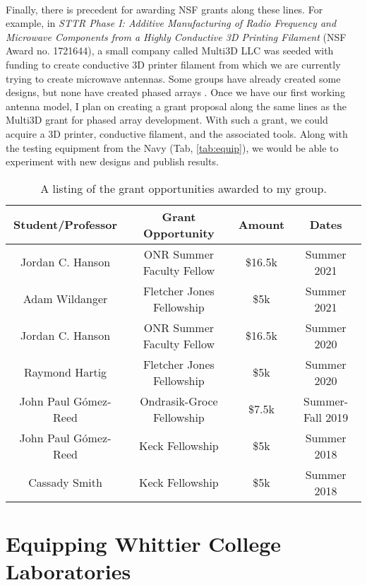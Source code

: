\documentclass[../../../main.tex]{subfiles}
\begin{document}
\\
\vspace{0.25cm}
Finally, there is precedent for awarding NSF grants along these lines.  For example, in \textit{STTR Phase I: Additive Manufacturing of Radio Frequency and Microwave Components from a Highly Conductive 3D Printing Filament} (NSF Award no. 1721644), a small company called Multi3D LLC was seeded with funding to create conductive 3D printer filament from which we are currently trying to create microwave antennas.  Some groups have already created some designs, but none have created phased arrays \cite{10.1016/j.addma.2017.10.002} \cite{10.1049/iet-map.2017.0104}.  Once we have our first working antenna model, I plan on creating a grant proposal along the same lines as the Multi3D grant for phased array development.  With such a grant, we could acquire a 3D printer, conductive filament, and the associated tools.  Along with the testing equipment from the Navy (Tab, \ref{tab:equip}), we would be able to experiment with new designs and publish results.

\begin{table}
\centering
\begin{tabular}{c c c c}
Student/Professor & Grant Opportunity & Amount & Dates \\ \hline
Jordan C. Hanson & ONR Summer Faculty Fellow & \$16.5k & Summer 2021 \\
Adam Wildanger & Fletcher Jones Fellowship & \$5k & Summer 2021 \\
Jordan C. Hanson & ONR Summer Faculty Fellow & \$16.5k & Summer 2020 \\
Raymond Hartig & Fletcher Jones Fellowship & \$5k & Summer 2020 \\
John Paul G\'{o}mez-Reed & Ondrasik-Groce Fellowship & \$7.5k & Summer-Fall 2019 \\
John Paul G\'{o}mez-Reed & Keck Fellowship & \$5k & Summer 2018 \\
Cassady Smith & Keck Fellowship & \$5k & Summer 2018 \\
\end{tabular}
\caption{\label{tab:funds} A listing of the grant opportunities awarded to my group.}
\end{table}
 
\section{Equipping Whittier College Laboratories}
\end{document}
